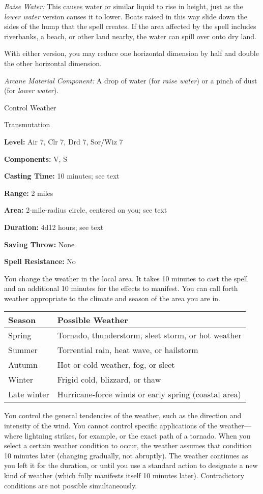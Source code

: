 \documentclass{article}
\begin{document}
\textit{Raise Water: }This causes water or similar liquid to rise in height, just 
as the \textit{lower water }version causes it to lower. Boats raised in this way 
slide down the sides of the hump that the spell creates. If the area affected by 
the spell includes riverbanks, a beach, or other land nearby, the water can spill 
over onto dry land.

With either version, you may reduce one horizontal dimension by half and double 
the other horizontal dimension.

\textit{Arcane Material Component: }A drop of water (for \textit{raise water}) 
or a pinch of dust (for \textit{lower water}).

\vspace{12pt}
Control Weather

Transmutation

\textbf{Level:} Air 7, Clr 7, Drd 7, Sor/Wiz 7

\textbf{Components:} V, S

\textbf{Casting Time:} 10 minutes; see text

\textbf{Range:} 2 miles

\textbf{Area:} 2-mile-radius circle, centered on you; see text

\textbf{Duration:} 4d12 hours; see text

\textbf{Saving Throw:} None

\textbf{Spell Resistance:} No

You change the weather in the local area. It takes 10 minutes to cast the spell 
and an additional 10 minutes for the effects to manifest.\textit{ }You can call 
forth weather appropriate to the climate and season of the area you are in.

\begin{tabular}{|>{\raggedright}p{44pt}|>{\raggedright}p{205pt}|}
\hline
S\textbf{eason} & P\textbf{ossible Weather}\tabularnewline
\hline
Spring & Tornado, thunderstorm, sleet storm, or hot weather\tabularnewline
\hline
Summer & Torrential rain, heat wave, or hailstorm\tabularnewline
\hline
Autumn & Hot or cold weather, fog, or sleet\tabularnewline
\hline
Winter & Frigid cold, blizzard, or thaw\tabularnewline
\hline
Late winter & Hurricane-force winds or early spring (coastal area)\tabularnewline
\hline
\end{tabular}

You control the general tendencies of the weather, such as the direction and intensity 
of the wind. You cannot control specific applications of the weather---where lightning 
strikes, for example, or the exact path of a tornado. When you select a certain 
weather condition to occur, the weather assumes that condition 10 minutes later 
(changing gradually, not abruptly). The weather continues as you left it for the 
duration, or until you use a standard action to designate a new kind of weather 
(which fully manifests itself 10 minutes later). Contradictory conditions are not 
possible simultaneously.
\end{document}

